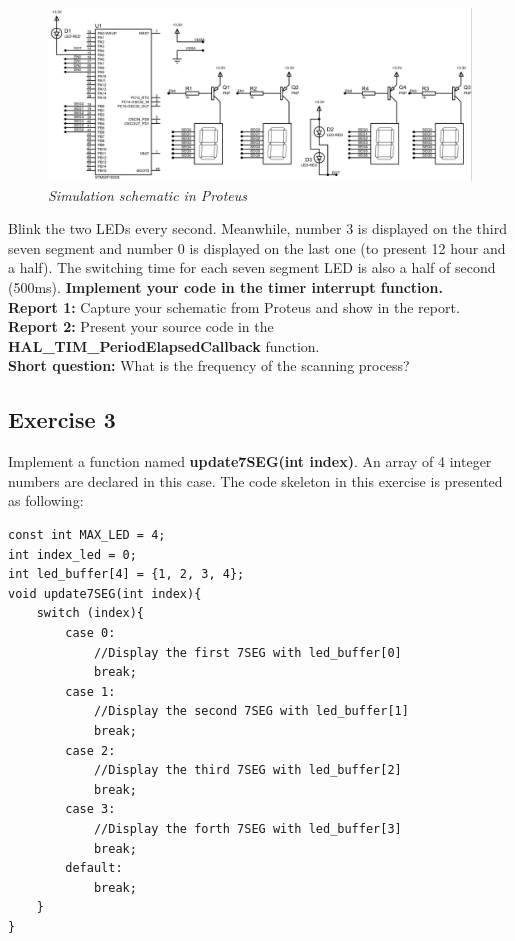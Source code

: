 \begin{figure}[!htp]
    \centering
    \includegraphics[width=5.5in]{source/picture/bai_2/lab2_ex2a.PNG}
    \caption{\textit{Simulation schematic in Proteus}}
    \label{bai2_pic1a}
\end{figure}

Blink the two LEDs every second. Meanwhile, number 3 is displayed on the third seven segment and number 0 is displayed on the last one (to present 12 hour and a half). The switching time for each seven segment LED is also a half of second (500ms). \textbf{Implement your code in the timer interrupt function.}\\

\textbf{Report 1: } Capture your schematic from Proteus and show in the report.\\

\textbf{Report 2: } Present your source code in the \textbf{HAL\_TIM\_PeriodElapsedCallback} function.\\

\textbf{Short question: } What is the frequency of the scanning process?\\

\subsection{Exercise 3}
Implement a function named \textbf{update7SEG(int index)}. An array of 4 integer numbers are declared in this case. The code skeleton in this exercise is presented as following:
\newpage
\begin{lstlisting}[caption=An example for your source code]
const int MAX_LED = 4;
int index_led = 0;
int led_buffer[4] = {1, 2, 3, 4};
void update7SEG(int index){
    switch (index){
        case 0:
            //Display the first 7SEG with led_buffer[0]
            break;
        case 1:
            //Display the second 7SEG with led_buffer[1]
            break;
        case 2:
            //Display the third 7SEG with led_buffer[2]
            break;
        case 3:
            //Display the forth 7SEG with led_buffer[3]
            break;
        default:
            break;
    }
}
\end{lstlisting}

